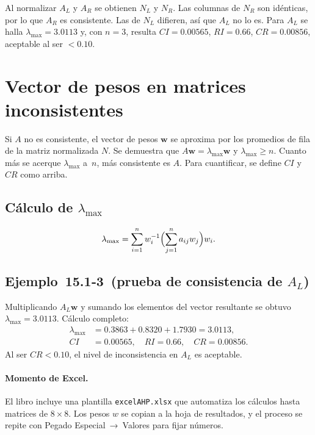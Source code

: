 \documentclass[11pt]{scrartcl}
\begin{document}
\newpage
Al normalizar $A_L$ y $A_R$ se obtienen $N_L$ y $N_R$. Las columnas de $N_R$ son idénticas, por lo que $A_R$ es consistente. Las de $N_L$ difieren, así que $A_L$ no lo es. Para $A_L$ se halla $\lambda_{\max}=3.0113$ y, con $n=3$, resulta $CI=0.00565$, $RI=0.66$, $CR=0.00856$, aceptable al ser $<0.10$.

\newpage
\section*{Vector de pesos en matrices inconsistentes}
Si $A$ no es consistente, el vector de pesos $\mathbf{w}$ se aproxima por los promedios de fila de la matriz normalizada $N$. Se demuestra que $A\mathbf{w}=\lambda_{\max}\mathbf{w}$ y $\lambda_{\max}\ge n$. Cuanto más se acerque $\lambda_{\max}$ a $n$, más consistente es $A$. Para cuantificar, se define $CI$ y $CR$ como arriba.

\subsection*{Cálculo de $\lambda_{\max}$}
\[\lambda_{\max}=\sum_{i=1}^nw_i^{-1}\Bigl(\sum_{j=1}^na_{ij}w_j\Bigr)w_i.\]

\newpage
\subsection*{Ejemplo 15.1‑3 (prueba de consistencia de $A_L$)}
Multiplicando $A_L\mathbf{w}$ y sumando los elementos del vector resultante se obtuvo $\lambda_{\max}=3.0113$. Cálculo completo:
\begin{align*}
\lambda_{\max}&=0.3863+0.8320+1.7930=3.0113,\\
CI&=0.00565,\quad RI=0.66,\quad CR=0.00856.
\end{align*}
Al ser $CR<0.10$, el nivel de inconsistencia en $A_L$ es aceptable.

\paragraph{Momento de Excel.} El libro incluye una plantilla \texttt{excelAHP.xlsx} que automatiza los cálculos hasta matrices de 8\,×\,8. Los pesos $w$ se copian a la hoja de resultados, y el proceso se repite con Pegado Especial → Valores para fijar números.
\end{document}
